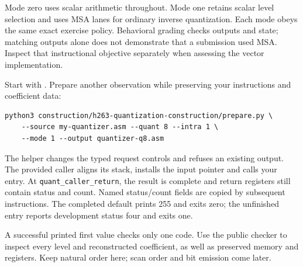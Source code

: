 Mode zero uses scalar arithmetic throughout. Mode one retains scalar level
selection and uses MSA lanes for ordinary inverse quantization. Each mode obeys
the same exact exercise policy. Behavioral grading checks outputs and state;
matching outputs alone does not demonstrate that a submission used MSA. Inspect
that instructional objective separately when assessing the vector implementation.

Start with . Prepare another
observation while preserving your instructions and coefficient data:
\begin{verbatim}
python3 construction/h263-quantization-construction/prepare.py \
    --source my-quantizer.asm --quant 8 --intra 1 \
    --mode 1 --output quantizer-q8.asm
\end{verbatim}
The helper changes the typed request controls and refuses an existing output.
The provided caller aligns its stack, installs the input pointer and calls your
entry. At \texttt{quant\_caller\_return}, the result is complete and return
registers still contain status and count. Named status/count fields are copied
by subsequent instructions. The completed default prints 255 and exits zero;
the unfinished entry reports development status four and exits one.

A successful printed first value checks only one code. Use the public checker to
inspect every level and reconstructed coefficient, as well as preserved memory
and registers. Keep natural order here; scan order and bit emission come later.
